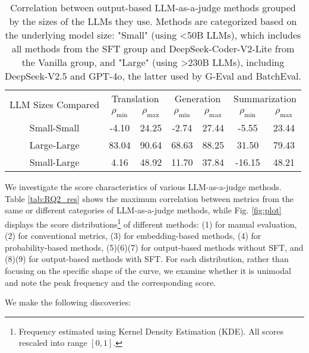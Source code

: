 \begin{table}[]
    \centering
    \caption{Correlation between output-based LLM-as-a-judge methods grouped by the sizes of the LLMs they use. Methods are categorized based on the underlying model size: "Small" (using <50B LLMs), which includes all methods from the SFT group and DeepSeek-Coder-V2-Lite from the Vanilla group, and "Large" (using >230B LLMs), including DeepSeek-V2.5 and GPT-4o, the latter used by G-Eval and BatchEval.}
    \vspace{-1.0em}
    \begin{tabular}{c|cc|cc|cc}
         \toprule
         \multirow{2}{*}{LLM Sizes Compared} & \multicolumn{2}{c|}{Translation} & \multicolumn{2}{c|}{Generation} & \multicolumn{2}{c}{Summarization} \\

         & \(\rho_{\min}\) & \(\rho_{\max}\) & \(\rho_{\min}\) & \(\rho_{\max}\) & \(\rho_{\min}\) & \(\rho_{\max}\) \\ \midrule

         Small-Small & -4.10 & 24.25 & -2.74 & 27.44 &  -5.55 & 23.44 \\
         Large-Large & 83.04 & 90.64 & 68.63 & 88.25 &  31.50 & 79.43 \\
         Small-Large &  4.16 & 48.92 & 11.70 & 37.84 & -16.15 & 48.21 \\ \bottomrule
    \end{tabular}
    \label{tab:RQ2_llm}
    \vspace{-1.0em}
\end{table}

We investigate the score characteristics of various LLM-as-a-judge methods. Table \ref{tab:RQ2_res} shows the maximum correlation between metrics from the same or different categories of LLM-as-a-judge methods, while Fig. \ref{fig:plot} displays the score distributions\footnote{Frequency estimated using Kernel Density Estimation (KDE). All scores rescaled into range \([0,1]\).} of different methods: (1) for manual evaluation, (2) for conventional metrics, (3) for embedding-based methods, (4) for probability-based methods, (5)(6)(7) for output-based methods without SFT, and (8)(9) for output-based methods with SFT. For each distribution, rather than focusing on the specific shape of the curve, we examine whether it is unimodal and note the peak frequency and the corresponding score. 

We make the following discoveries:

